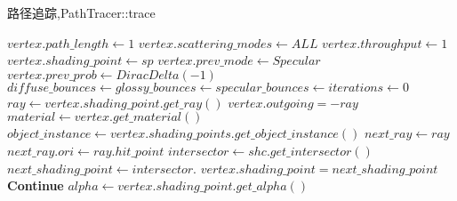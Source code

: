 \documentclass[11pt]{ctexart}
\begin{document}
\begin{algorithm}
	\caption{路径追踪,PathTracer::trace}
		\begin{algorithmic} %
				\State  $vertex.path\_length \gets 1$
				\State  $vertex.scattering\_modes \gets  ALL$
				\State	$vertex.throughput \gets 1$
				\State	$vertex.shading\_point \gets sp$
				\State 	$vertex.prev\_mode \gets Specular$
				\State	$vertex.prev\_prob \gets DiracDelta(-1)$
				\State	$diffuse\_bounces \gets glossy\_bounces \gets specular\_bounces \gets iterations \gets 0$
					\State $ray \gets vertex.shading\_point.get\_ray()$
					\State $vertex.outgoing = -ray$
						\State	$material \gets vertex.get\_material()$
							\State $object\_instance \gets vertex.shading\_points.get\_object\_instance()$
								\State $next\_ray \gets ray$
								\State $next\_ray.ori \gets ray.hit\_point$
								\State $intersector \gets shc.get\_intersector()$
								\State $next\_shading\_point \gets intersector.$ 
								\State $vertex.shading\_point = next\_shading\_point$
								\State \textbf {Continue}
							\Else 
							\State {}
							\EndIf
						\EndIf
					\EndIf
				\EndWhile
			\EndFunction
			\State
					\State $alpha \gets vertex.shading\_point.get\_alpha()$
						\State {}
					
					\EndIf
				\EndIf
				\State {}
			\EndFunction

		\end{algorithmic}
		
\end{algorithm}
\end{document}
